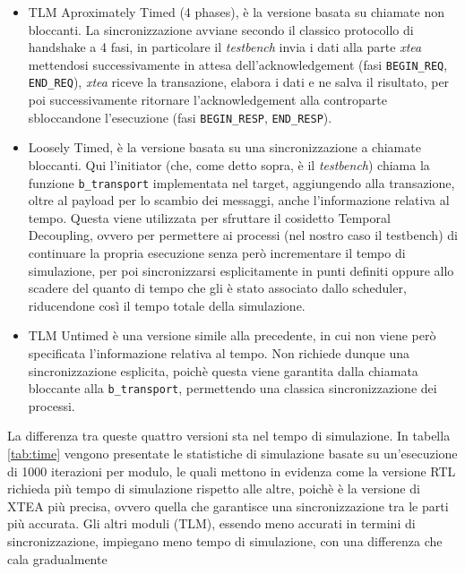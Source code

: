 \documentclass[]{IEEEtran}
\newcommand{\code}[1]{\texttt{#1}}
\begin{document}
\begin{itemize}
    \begin{itemize}
        \item TLM Aproximately Timed (4 phases), è la versione basata su chiamate non bloccanti. La sincronizzazione 
        avviane secondo il classico protocollo di handshake a 4 fasi, in particolare il \emph{testbench} invia i dati 
        alla parte \emph{xtea} mettendosi successivamente in attesa dell'acknowledgement (fasi \code{BEGIN\_REQ}, 
        \code{END\_REQ}), \emph{xtea} riceve la transazione, elabora i dati e ne salva il risultato, per poi successivamente 
        ritornare l'acknowledgement alla controparte sbloccandone l'esecuzione (fasi \code{BEGIN\_RESP}, 
        \code{END\_RESP}).
        \item Loosely Timed, \`e la versione basata su una sincronizzazione a chiamate bloccanti. Qui l'initiator (che, 
        come detto sopra, è il \emph{testbench}) chiama la funzione \code{b\_transport} implementata nel target, 
        aggiungendo alla transazione, oltre al payload per lo scambio dei messaggi, anche l'informazione relativa al 
        tempo. Questa viene utilizzata per sfruttare il cosidetto Temporal Decoupling, ovvero per permettere ai processi 
        (nel nostro caso il testbench) di continuare la propria esecuzione senza per\`o incrementare il tempo di 
        simulazione, per poi sincronizzarsi esplicitamente in punti definiti oppure allo scadere del quanto di tempo 
        che gli è stato associato dallo scheduler, riducendone cos\`i il tempo totale della simulazione.
        \item TLM Untimed \`e una versione simile alla precedente, in cui non viene per\`o specificata l'informazione 
        relativa al tempo. Non richiede dunque una sincronizzazione esplicita, poich\`e questa viene garantita dalla 
        chiamata bloccante alla \code{b\_transport}, permettendo una classica sincronizzazione dei processi.
    \end{itemize}
\end{itemize}
La differenza tra queste quattro versioni sta nel tempo di simulazione. In tabella \ref{tab:time} vengono presentate le 
statistiche di simulazione basate su un'esecuzione di 1000 iterazioni per modulo, le quali mettono in evidenza come la 
versione RTL richieda più tempo di simulazione rispetto alle altre, poich\`e \`e la versione di XTEA pi\`u precisa, 
ovvero quella che garantisce una sincronizzazione tra le parti pi\`u accurata. Gli altri moduli (TLM), essendo meno 
accurati in termini di sincronizzazione, impiegano meno tempo di simulazione, con una differenza che cala gradualmente 
\end{document}
